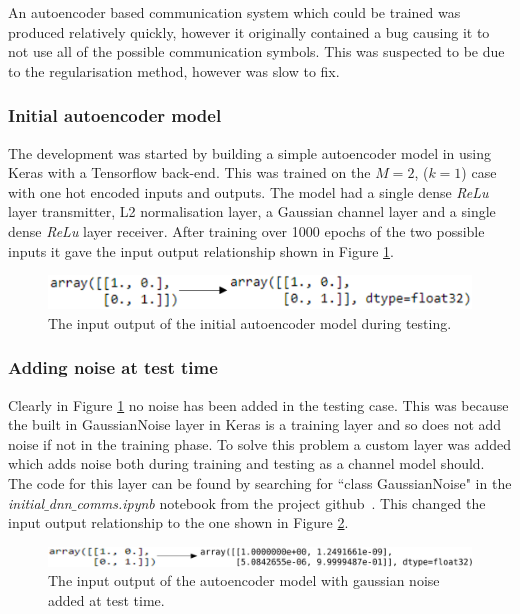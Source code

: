 \documentclass[12pt,onecolumn,letterpaper]{article}
\newcommand{\code}{\textit}
\begin{document}
An autoencoder based communication system which could be trained was produced relatively quickly, however it originally contained a bug causing it to not use all of the possible communication symbols. This was suspected to be due to the regularisation method, however was slow to fix.

\subsubsection{Initial autoencoder model}

The development was started by building a simple autoencoder model in using Keras with a Tensorflow back-end. This was trained on the $M=2$, ($k=1$) case with one hot encoded inputs and outputs. The model had a single dense \code{ReLu} layer transmitter, L2 normalisation layer, a Gaussian channel layer and a single dense \code{ReLu} layer receiver. After training over 1000 epochs of the two possible inputs it gave the input output relationship shown in Figure \ref{fig:CodeInitialOutput}.

\begin{figure}[t]
   \centering
   \includegraphics[width=0.8\linewidth]{figures/initial_ae_output.png}
   \caption{The input output of the initial autoencoder model during testing. }
\label{fig:CodeInitialOutput}
\end{figure}

\subsubsection{Adding noise at test time}

Clearly in Figure \ref{fig:CodeInitialOutput} no noise has been added in the testing case. This was because the built in GaussianNoise layer in Keras is a training layer and so does not add noise if not in the training phase. To solve this problem a custom layer was added which adds noise both during training and testing as a channel model should. The code for this layer can be found by searching for ``class GaussianNoise" in the \code{initial$\_$dnn$\_$comms.ipynb} notebook from the project github~\cite{AwGithub}. This changed the input output relationship to the one shown in Figure \ref{fig:CodeGaussianNoise2}.

\begin{figure}[t]
   \centering
   \includegraphics[width=0.8\linewidth]{figures/ae1_1_with_noise.png}
   \caption{The input output of the autoencoder model with gaussian noise added at test time. }
\label{fig:CodeGaussianNoise2}
\end{figure}
\end{document}
